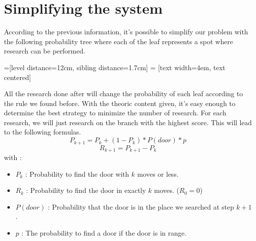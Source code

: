 \documentclass{article}
\begin{document}
\section{Simplifying the system}
According to the previous information, it's possible to simplify our problem
with the following probability tree where each of the leaf represents a spot
where research can be performed.

=[level distance=12cm, sibling distance=1.7cm]
 = [text width=4em, text centered]
\begin{center}
\end{center}

All the research done after will change the probability of each leaf according
to the rule we found before. With the theoric content given, it's easy enough
to determine the best strategy to minimize the number of research. For each
research, we will just research on the branch with the highest score. This will
lead to the following formulas.
$$P_{k+1} = P_k + (1 - P_k) * P(door) * p$$
$$R_{k+1} = P_{k+1} - P_{k}$$
with :
\begin{itemize}
\item $P_k$ : Probability to find the door with $k$ moves or less.
\item $R_k$ : Probability to find the door in exactly $k$ moves. ($R_0 = 0$)
\item $P(door)$ : Probability that the door is in the place we searched at step
  $k+1$.
\item $p$ : The probability to find a door if the door is in range.
\end{itemize}
\end{document}
